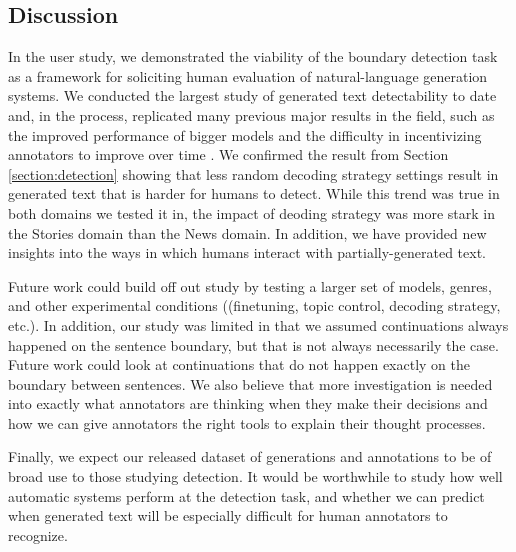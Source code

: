 \subsection{Discussion}
\label{section:roft_discussion}
In the \ROFT{} user study, we demonstrated the viability of the boundary detection task as a framework for soliciting human evaluation of natural-language generation systems.
We conducted the largest study of generated text detectability to date and, in the process, replicated many previous major results in the field, such as the improved performance of bigger models \citep{kaplan2020scaling} and the difficulty in incentivizing annotators to improve over time \citep{clark2021all}.
We confirmed the result from Section \ref{section:detection} showing that less random decoding strategy settings result in generated text that is harder for humans to detect.
While this trend was true in both domains we tested it in, the impact of deoding strategy was more stark in the Stories domain than the News domain.
In addition, we have provided new insights into the ways in which humans interact with partially-generated text.

Future work could build off out study by testing a larger set of models, genres, and other experimental conditions ((finetuning, topic control, decoding strategy, etc.).
In addition, our study was limited in that we assumed continuations always happened on the sentence boundary, but that is not always necessarily the case.
Future work could look at continuations that do not happen exactly on the boundary between sentences.
We also believe that more investigation is needed into exactly what annotators are thinking when they make their decisions and how we can give annotators the right tools to explain their thought processes.


Finally, we expect our released dataset of generations and annotations to be of broad use to those studying detection.
It would be worthwhile to study how well automatic systems perform at the detection task, and whether we can predict when generated text will be especially difficult for human annotators to recognize.


